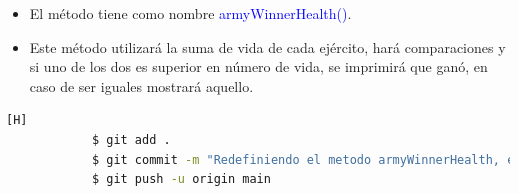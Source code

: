 \documentclass{article}
\begin{document}
        \begin{itemize}
            \item El método tiene como nombre \textcolor{blue}{armyWinnerHealth()}.
            \item Este método utilizará la suma de vida de cada ejército, hará comparaciones y si uno de los dos es superior en número de vida, se imprimirá que ganó, en caso de ser iguales mostrará aquello.
        \end{itemize}
        
        

        \begin{lstlisting}[language=bash,caption={Commit \href{https://github.com/hernanchoquehuanca/fp2-23b/commit/e0d05ce1a7a50488f6f458c373a614a107d65489}{e0d05ce}: Se implementó el método armyWinnerHealth}][H]
    		$ git add .
    		$ git commit -m "Redefiniendo el metodo armyWinnerHealth, el cual muestra un ejercito ganador o empate dependiendo de la suma de vida de los ejercitos"	
    		$ git push -u origin main
    	\end{lstlisting}
        
        
\end{document}
